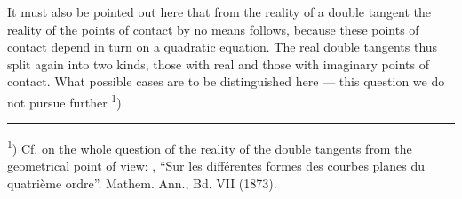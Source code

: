 
It must also be pointed out here that from the reality
of a double tangent the reality of the points of contact
by no means follows, because these points of contact depend
in turn on a quadratic equation. The real double tangents
thus split again into two kinds, those with real and
those with imaginary points of contact. What possible
cases are to be distinguished here — this question we do not
pursue further \textsuperscript{1}).

\begin{center}
\rule{0.3\linewidth}{0.4pt}
\end{center}

\textsuperscript{1}) Cf. on the whole question of the reality of the double tangents
from the geometrical point of view: , ``Sur les diff\'erentes formes
des courbes planes du quatri\`eme ordre''. Mathem. Ann., Bd. VII (1873).
